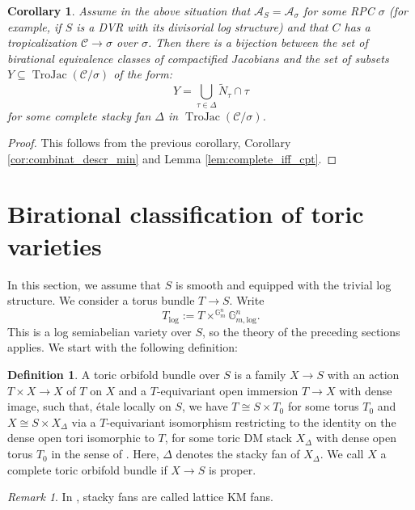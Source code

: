 \documentclass[11pt]{amsart}
\newtheorem{corollary}[theorem]{Corollary}
\theoremstyle{definition}
\newtheorem{definition}[theorem]{Definition}
\theoremstyle{remark}
\newtheorem{remark}[theorem]{Remark}
\def\log{\mathrm{log}}
\DeclareMathOperator{\TroJac}{TroJac}
\begin{document}
\begin{corollary}
	Assume in the above situation that $\mathcal{A}_{S}=\mathcal{A}_{\sigma}$ for some RPC $\sigma$ (for example,
	if $S$ is a DVR with its divisorial log structure) and that $C$ has a tropicalization $\mathcal{C}\to \sigma$
	over $\sigma$. Then there is a bijection between the set of birational equivalence
	classes of compactified Jacobians and the set of subsets $Y\subseteq \TroJac(\mathcal{C}/\sigma)$
	of the form:
	$$Y=\bigcup_{\tau\in \Delta}\tilde{N}_{\tau}\cap \tau$$
	for some complete stacky fan $\Delta$ in $\TroJac(\mathcal{C}/\sigma)$.
\end{corollary}

\begin{proof}
	This follows from the previous corollary, Corollary \ref{cor:combinat_descr_min} and Lemma \ref{lem:complete_iff_cpt}.
\end{proof}

\section{Birational classification of toric varieties}

In this section, we assume that $S$ is smooth and equipped with the trivial log structure. We consider
a torus bundle $T\to S$. Write
$$T_{\log}:=T\times^{\mathbb{G}_{m}^{n}}\mathbb{G}_{m,\log}^{n}.$$
This is a log semiabelian variety over $S$, so the theory of the preceding sections applies. We start with
the following definition:

\begin{definition}
	A toric orbifold bundle over $S$ is a family $X\to S$ with an action $T\times X\to X$
	of $T$ on $X$ and a $T$-equivariant open immersion $T\to X$ with dense image, such
	that, étale locally on $S$, we have $T\cong S\times T_0$ for some torus $T_0$
	and $X\cong S\times X_{\Delta}$ via a $T$-equivariant isomorphism restricting to the identity on the dense open tori
	isomorphic to $T$, for some toric DM stack
	$X_{\Delta}$ with dense open torus $T_0$ in the sense of
	\cite[Definition 3.10.1]{ATheoryOfStaGillam2015}. Here, $\Delta$ denotes the stacky fan of $X_{\Delta}$.
	We call $X$ a complete toric orbifold bundle if $X\to S$ is proper.
\end{definition}

\begin{remark}
	In \cite{ATheoryOfStaGillam2015}, stacky fans are called lattice KM fans.
\end{remark}
\end{document}
